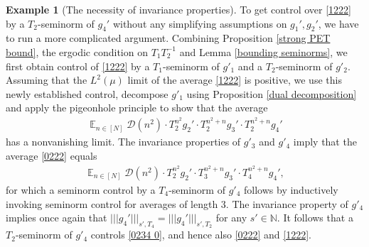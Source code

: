 \documentclass[11pt]{amsart}
\theoremstyle{definition}
\newtheorem{example}{Example}
\newcommand{\N}{{\mathbb N}}
\newcommand{\CD}{{\mathcal D}}
\newcommand{\nnorm}[1]{\lvert\!|\!| #1|\!|\!\rvert}
\newcommand{\inv}{^{-1}}
\DeclareMathOperator*{\E}{\mathbb{E}}
\begin{document}
\begin{example}[The necessity of invariance properties]
To get control over \eqref{1222} by a $T_2$-seminorm of $g_4'$ without any simplifying assumptions on $g_1', g_2'$, we have to run a more complicated argument. Combining Proposition \ref{strong PET bound}, the ergodic condition on $T_1T_2\inv$ and Lemma \ref{bounding seminorms}, we first obtain control of \eqref{1222} by a $T_1$-seminorm of $g'_1$ and a $T_2$-seminorm of $g'_2$. Assuming that the $L^2(\mu)$ limit of the average \eqref{1222} is positive,  we use this newly established control, decompose $g'_1$ using Proposition \ref{dual decomposition} and apply the pigeonhole principle to show that the average
\begin{align}\label{0222}
    \E_{n\in[N]}\CD(n^2)\cdot T_2^{n^2} g_2'\cdot T_2^{n^2+n}g_3'\cdot T_2^{n^2+n}g_4'
\end{align}
has a nonvanishing limit. The invariance properties of $g'_3$ and $g'_4$ imply that the average \eqref{0222} equals \begin{align}\label{0234 0}
    \E_{n\in[N]}\CD(n^2)\cdot T_2^{n^2} g_2'\cdot T_3^{n^2+n}g_3'\cdot T_4^{n^2+n}g_4',
\end{align}
for which a seminorm control by a $T_4$-seminorm of $g'_4$  follows by inductively invoking seminorm control for averages of length 3. The invariance property of $g'_4$ implies once again that $\nnorm{g_4'}_{s', T_4} =\nnorm{g_4'}_{s', T_2}$ for any $s'\in\N$. It follows that a $T_2$-seminorm of $g'_4$ controls \eqref{0234 0}, and hence also \eqref{0222} and \eqref{1222}.



\end{example}
\end{document}

